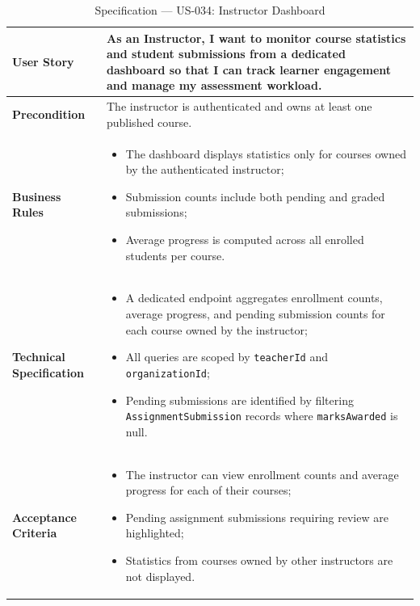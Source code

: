 \begin{table}[H]
\centering
\caption{Specification — US-034: Instructor Dashboard}
\label{tab:us034}
\renewcommand{\arraystretch}{1.2}
\begin{tabularx}{\textwidth}{|p{3.5cm}|X|}
\hline
\textbf{User Story} & As an Instructor, I want to monitor course statistics and student submissions from a dedicated dashboard so that I can track learner engagement and manage my assessment workload. \\
\hline
\textbf{Precondition} & The instructor is authenticated and owns at least one published course. \\
\hline
\textbf{Business Rules} &
\begin{itemize}[noitemsep, topsep=2pt]
  \item The dashboard displays statistics only for courses owned by the authenticated instructor;
  \item Submission counts include both pending and graded submissions;
  \item Average progress is computed across all enrolled students per course.
\end{itemize} \\
\hline
\textbf{Technical Specification} &
\begin{itemize}[noitemsep, topsep=2pt]
  \item A dedicated endpoint aggregates enrollment counts, average progress, and pending submission counts for each course owned by the instructor;
  \item All queries are scoped by \texttt{teacherId} and \texttt{organizationId};
  \item Pending submissions are identified by filtering \texttt{AssignmentSubmission} records where \texttt{marksAwarded} is null.
\end{itemize} \\
\hline
\textbf{Acceptance Criteria} &
\begin{itemize}[noitemsep, topsep=2pt]
  \item The instructor can view enrollment counts and average progress for each of their courses;
  \item Pending assignment submissions requiring review are highlighted;
  \item Statistics from courses owned by other instructors are not displayed.
\end{itemize} \\
\hline
\end{tabularx}
\end{table}

